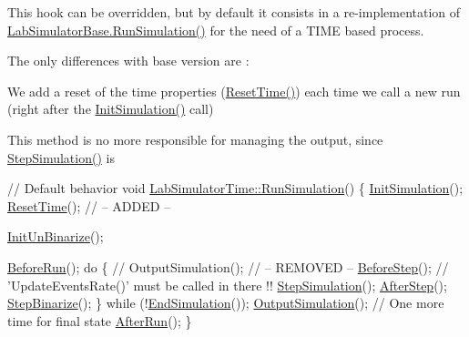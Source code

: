 This hook can be overridden, but by default it consists in a re-\/implementation of \hyperlink{classelps_1_1_lab_simulator_base_ab48e943c2b85b25ff96b2aab4d9aa4bd}{Lab\+Simulator\+Base.\+Run\+Simulation()} for the need of a T\+I\+M\+E based process.~\newline


The only differences with base version are \+:
\begin{DoxyItemize}
\item We add a reset of the time properties (\hyperlink{classelps_1_1_lab_simulator_time_ad2f79a788d88d06558e17ce65a89f769}{Reset\+Time()}) each time we call a new run (right after the \hyperlink{classelps_1_1_lab_simulator_base_aa14aa05df8173ffd2a2e67aa25f3cea5}{Init\+Simulation()} call)
\item This method is no more responsible for managing the output, since \hyperlink{classelps_1_1_lab_simulator_time_ad8845591018d7d9bdf38932faa2a04dd}{Step\+Simulation()} is
\end{DoxyItemize}


\begin{DoxyCode}
\textcolor{comment}{// Default behavior}
\textcolor{keywordtype}{void} \hyperlink{classelps_1_1_lab_simulator_time_a9cf1c9a315d192ea8c065389788fd2c5}{LabSimulatorTime::RunSimulation}()
\{
        \hyperlink{classelps_1_1_lab_simulator_base_aa14aa05df8173ffd2a2e67aa25f3cea5}{InitSimulation}();
        \hyperlink{classelps_1_1_lab_simulator_time_ad2f79a788d88d06558e17ce65a89f769}{ResetTime}();                    \textcolor{comment}{// -- ADDED --}

        \hyperlink{classelps_1_1_lab_simulator_base_a1339bc2fd37e7a4cc5c8792f447bf348}{InitUnBinarize}();

        \hyperlink{classelps_1_1_lab_simulator_base_abf0012f53b199184d9359656f2f9e4e1}{BeforeRun}();
        \textcolor{keywordflow}{do}
        \{
                \textcolor{comment}{// OutputSimulation();      // -- REMOVED --}
                \hyperlink{classelps_1_1_lab_simulator_base_a51232753515304871678d22aea555a8b}{BeforeStep}();               \textcolor{comment}{// 'UpdateEventsRate()' must be called in there !!}
                \hyperlink{classelps_1_1_lab_simulator_time_ad8845591018d7d9bdf38932faa2a04dd}{StepSimulation}();
                \hyperlink{classelps_1_1_lab_simulator_base_ad00284fc35dec38e6933a37858cb72c6}{AfterStep}();
                \hyperlink{classelps_1_1_lab_simulator_base_ac1dcb0ae906c0e729a31172a02c243e2}{StepBinarize}();
        \}
        \textcolor{keywordflow}{while} (!\hyperlink{classelps_1_1_lab_simulator_time_ada8cfaa732adce02ebe8d8f59d758257}{EndSimulation}());
        \hyperlink{classelps_1_1_lab_simulator_base_ac0c49279bf16f19b4f8fbd856e3fc6d6}{OutputSimulation}();             \textcolor{comment}{// One more time for final state}
        \hyperlink{classelps_1_1_lab_simulator_base_afbd964545df8788fe65a488e731a7d05}{AfterRun}();
\}
\end{DoxyCode}


